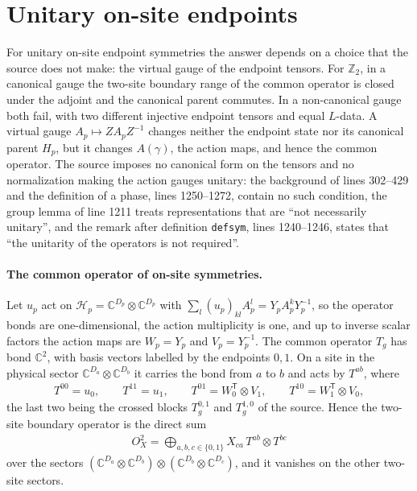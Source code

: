 \documentclass{article}
\begin{document}
\section{Unitary on-site endpoints}
For unitary on-site endpoint symmetries the answer depends on a choice
that the source does not make: the virtual gauge of the endpoint tensors.
For $\mathbb Z_2$, in a canonical gauge the two-site boundary range of the
common operator is closed under the adjoint and the canonical parent
commutes. In a non-canonical gauge both fail, with two different injective
endpoint tensors and equal $L$-data. A virtual gauge
$A_p\mapsto ZA_pZ^{-1}$ changes neither the endpoint state nor its
canonical parent $H_p$, but it changes $A(\gamma)$, the action maps, and
hence the common operator. The source imposes no canonical form on the
tensors and no normalization making the action gauges unitary: the
background of lines 302--429 and the definition of a phase, lines
1250--1272, contain no such condition, the group lemma of line 1211 treats
representations that are ``not necessarily unitary'', and the remark after
definition \texttt{defsym}, lines 1240--1246, states that ``the unitarity
of the operators is not required''.

\paragraph{The common operator of on-site symmetries.} Let $u_p$ act on
$\mathcal H_p=\mathbb C^{D_p}\otimes\mathbb C^{D_p}$ with
$\sum_l(u_p)_{kl}A_p^l=Y_pA_p^kY_p^{-1}$, so the operator bonds are
one-dimensional, the action multiplicity is one, and up to inverse scalar
factors the action maps are $W_p=Y_p$ and $V_p=Y_p^{-1}$. The common
operator $T_g$ has bond $\mathbb C^2$, with basis vectors labelled by the
endpoints $0,1$. On a
site in the physical sector $\mathbb C^{D_a}\otimes\mathbb C^{D_b}$ it
carries the bond from $a$ to $b$ and acts by $T^{ab}$, where
\begin{align}
    T^{00}=u_0,\qquad T^{11}=u_1,\qquad
    T^{01}=W_0^{\mathsf T}\otimes V_1,\qquad
    T^{10}=W_1^{\mathsf T}\otimes V_0 ,
    \label{eq:glm23_parent_commutation_operator_sectors}
\end{align}
the last two being the crossed blocks $T^{0,1}_g$ and $T^{1,0}_g$ of the
source. Hence the two-site boundary operator is the direct sum
\begin{align}
    O^2_X=\bigoplus_{a,b,c\in\{0,1\}}X_{ca}\,T^{ab}\otimes T^{bc}
    \label{eq:glm23_parent_commutation_boundary_operator}
\end{align}
over the sectors $(\mathbb C^{D_a}\otimes\mathbb C^{D_b})\otimes
    (\mathbb C^{D_b}\otimes\mathbb C^{D_c})$, and it vanishes on the other
two-site sectors.
\end{document}

